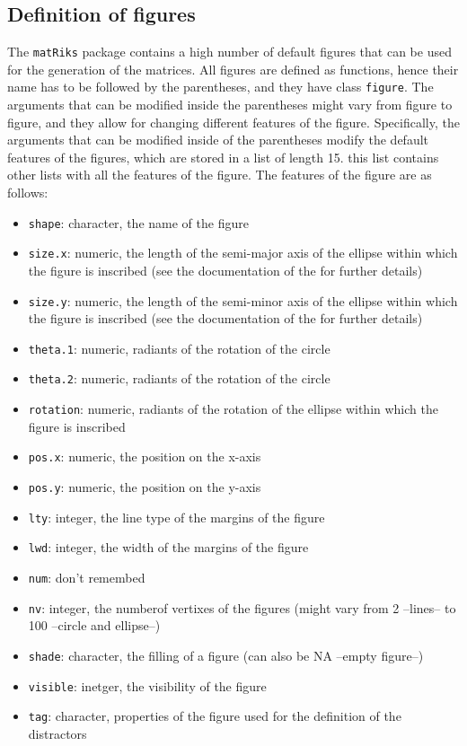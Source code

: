 \subsection{Definition of figures}\label{definition-of-figures}

The \texttt{matRiks} package contains a high number of default figures that can be used for the generation of the matrices.
All figures are defined as functions, hence their name has to be followed by the parentheses, and they have class \texttt{figure}.
The arguments that can be modified inside the parentheses might vary from figure to figure, and they allow for changing different features of the figure.
Specifically, the arguments that can be modified inside of the parentheses modify the default features of the figures, which are stored in a list of length 15. this list contains other lists with all the features of the figure.
The features of the figure are as follows:

\begin{itemize}
\tightlist
\item
  \texttt{shape}: character, the name of the figure
\item
  \texttt{size.x}: numeric, the length of the semi-major axis of the ellipse within which the figure is inscribed (see the documentation of the  for further details)
\item
  \texttt{size.y}: numeric, the length of the semi-minor axis of the ellipse within which the figure is inscribed (see the documentation of the  for further details)
\item
  \texttt{theta.1}: numeric, radiants of the rotation of the circle
\item
  \texttt{theta.2}: numeric, radiants of the rotation of the circle
\item
  \texttt{rotation}: numeric, radiants of the rotation of the ellipse within which the figure is inscribed
\item
  \texttt{pos.x}: numeric, the position on the x-axis
\item
  \texttt{pos.y}: numeric, the position on the y-axis
\item
  \texttt{lty}: integer, the line type of the margins of the figure
\item
  \texttt{lwd}: integer, the width of the margins of the figure
\item
  \texttt{num}: don't remembed
\item
  \texttt{nv}: integer, the numberof vertixes of the figures (might vary from 2 --lines-- to 100 --circle and ellipse--)
\item
  \texttt{shade}: character, the filling of a figure (can also be NA --empty figure--)
\item
  \texttt{visible}: inetger, the visibility of the figure
\item
  \texttt{tag}: character, properties of the figure used for the definition of the distractors
\end{itemize}

